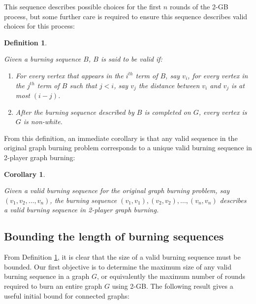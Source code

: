 \documentclass{mpaper}
\newtheorem{definition}[theorem]{Definition}
\newtheorem{corollary}[theorem]{Corollary}
\begin{document}
This sequence describes possible choices for the first $n$ rounds of the 2-GB process, but some further care is required to ensure this sequence describes valid choices for this process:

\begin{definition}
\label{def/valid-burning}

Given a burning sequence $B$, $B$ is said to be \emph{valid} if:

\begin{enumerate}
  \item For every vertex that appears in the $i^{th}$ term of $B$, say $v_i$, for every vertex in the $j^{th}$ term of $B$ such that $j < i$, say $v_j$ the distance between $v_i$ and $v_j$ is at most $(i-j)$.
  \item After the burning sequence described by $B$ is completed on $G$, every vertex is $G$ is non-white. 
\end{enumerate}

\end{definition}

From this definition, an immediate corollary is that any valid sequence in the original graph burning problem corresponds to a unique valid burning sequence in 2-player graph burning:

\begin{corollary}
\label{cor/burning-subset}

Given a valid burning sequence for the original graph burning problem, say $(v_1, v_2, \dots, v_n)$, the burning sequence $(v_1, v_1), (v_2, v_2), \dots, (v_n, v_n)$ describes a valid burning sequence in 2-player graph burning.

\end{corollary}

\subsection{Bounding the length of burning sequences}

From Definition \ref{def/valid-burning}, it is clear that the size of a valid burning sequence must be bounded. Our first objective is to determine the maximum size of any valid burning sequence in a graph $G$, or equivalently the maximum number of rounds required to burn an entire graph $G$ using 2-GB. The following result gives a useful initial bound for connected graphs:
\end{document}
